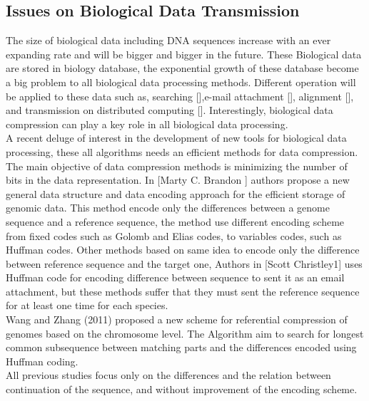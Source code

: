 \documentclass[preprint,12pt]{elsarticle}
\begin{document}
\subsection{Issues on Biological Data Transmission}
The size of biological data including DNA sequences increase with an ever expanding rate and will be bigger and bigger in the future. These Biological data are stored in biology database, the exponential growth of these database become a big problem to all biological data processing methods.
Different operation will be applied to these data such as, searching [],e-mail attachment [], alignment [], and transmission on distributed computing []. Interestingly, biological data compression can play a key role in all biological data processing.\\  
A recent deluge of interest in the development of new tools for biological data processing, these all algorithms needs an efficient methods for data compression. The main objective of data compression methods is minimizing the number of bits in the data representation. 
In [Marty C. Brandon ] authors propose a new general data structure and data encoding approach for the efficient storage of genomic data. This method encode only the differences between a genome sequence and a reference sequence, the method use different encoding scheme from fixed codes such as Golomb and Elias codes, to variables codes, such as Huffman codes. Other methods based on same idea to encode only the difference between reference sequence and the target one, Authors in [Scott Christley1] uses Huffman code for encoding difference between sequence to sent it as an email attachment, but these methods suffer that they must sent the reference sequence for at least one time for each species.\\
Wang and Zhang (2011) proposed a new scheme for referential compression of genomes based on the chromosome level. The Algorithm aim to search for longest common subsequence between matching parts and the differences encoded using Huffman coding.\\
All previous studies focus only on the differences and the relation between continuation of the sequence, and without improvement of the encoding scheme.
\end{document}
